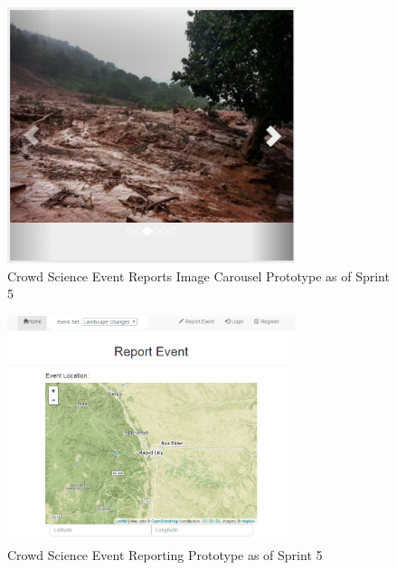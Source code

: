 \begin{figure}[tbh]
\begin{center}
\includegraphics[width=0.75\textwidth]{./figures/prototype_S5_imagecarousel.png}
\end{center}
\caption{Crowd Science Event Reports Image Carousel Prototype as of Sprint 5\label{prototype_S5_imagecarousel}}
\end{figure}

\begin{figure}[tbh]
\begin{center}
\includegraphics[width=0.75\textwidth]{./figures/prototype_S5_report_1.png}
\end{center}
\caption{Crowd Science Event Reporting Prototype as of Sprint 5\label{prototype_S5_report_1}}
\end{figure}

